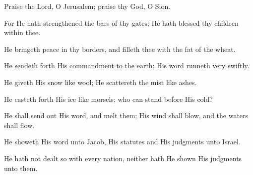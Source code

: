 Praise the Lord, O Jerusalem; praise thy God, O Sion.

For He hath strengthened the bars of thy gates; He hath blessed thy children within thee.

He bringeth peace in thy borders, and filleth thee with the fat of the wheat.

He sendeth forth His commandment to the earth; His word runneth very swiftly.

He giveth His snow like wool; He scattereth the mist like ashes.

He casteth forth His ice like morsels; who can stand before His cold?

He shall send out His word, and melt them; His wind shall blow, and the waters shall flow.

He showeth His word unto Jacob, His statutes and His judgments unto Israel.

He hath not dealt so with every nation, neither hath He shown His judgments unto them.

